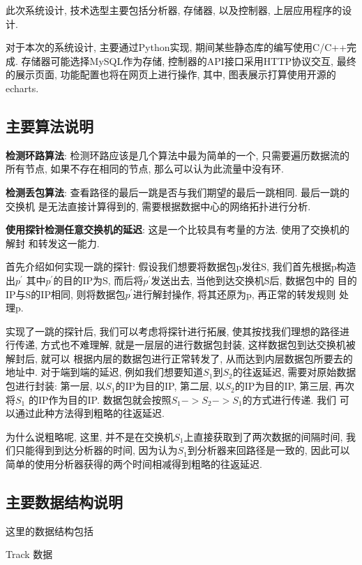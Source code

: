 {\begin{mdframed}[everyline=true]
此次系统设计, 技术选型主要包括分析器, 存储器, 以及控制器,
上层应用程序的设计.

对于本次的系统设计, 主要通过Python实现,
期间某些静态库的编写使用C/C++完成. 存储器可能选择MySQL作为存储,
控制器的API接口采用HTTP协议交互, 最终的展示页面,
功能配置也将在网页上进行操作, 其中, 图表展示打算使用开源的echarts.

\subsection{主要算法说明}

\textbf{检测环路算法}: 检测环路应该是几个算法中最为简单的一个,
只需要遍历数据流的所有节点, 如果不存在相同的节点,
那么可以认为此流量中没有环.

\textbf{检测丢包算法}: 查看路径的最后一跳是否与我们期望的最后一跳相同.
最后一跳的交换机 是无法直接计算得到的,
需要根据数据中心的网络拓扑进行分析.

\textbf{使用探针检测任意交换机的延迟}: 这是一个比较具有考量的方法.
使用了交换机的解封 和转发这一能力.

首先介绍如何实现一跳的探针: 假设我们想要将数据包p发往S,
我们首先根据p构造出\(p^{'}\) 其中\(p^{'}\)的目的IP为S,
而后将\(p^{'}\)发送出去, 当他到达交换机S后, 数据包中的
目的IP与S的IP相同, 则将数据包\(p^{'}\)进行解封操作, 将其还原为p,
再正常的转发规则 处理p.

实现了一跳的探针后, 我们可以考虑将探针进行拓展,
使其按找我们理想的路径进行传递, 方式也不难理解,
就是一层层的进行数据包封装, 这样数据包到达交换机被解封后, 就可以
根据内层的数据包进行正常转发了, 从而达到内层数据包所要去的地址中.
对于端到端的延迟, 例如我们想要知道\(S_{1}\)到\(S_{2}\)的往返延迟,
需要对原始数据包进行封装: 第一层, 以\(S_{1}\)的IP为目的IP, 第二层,
以\(S_{2}\)的IP为目的IP, 第三层, 再次将\(S_{1}\) 的IP作为目的IP.
数据包就会按照\(S_{1} -> S_{2} -> S_{1}\)的方式进行传递. 我们
可以通过此种方法得到粗略的往返延迟.

为什么说粗略呢, 这里,
并不是在交换机\(S_{1}\)上直接获取到了两次数据的间隔时间,
我们只能得到到达分析器的时间, 因为认为\(S_{1}\)到分析器来回路径是一致的,
因此可以 简单的使用分析器获得的两个时间相减得到粗略的往返延迟.

\subsection{主要数据结构说明}

这里的数据结构包括

Track 数据


\end{mdframed}}
